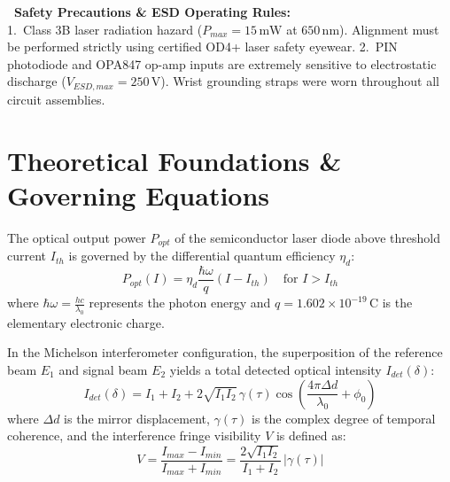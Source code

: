 \documentclass[11pt,a4paper,parskip=half,headsepline=0.6pt,footsepline=0.4pt]{scrartcl}
\begin{document}
\par \vspace{2pt}

\begin{tcolorbox}[calloutbox]
  \textcolor{coralhighlight}{\textbf{\faExclamationTriangle\ Safety Precautions \& ESD Operating Rules:}} \\
  \footnotesize
  1.~Class 3B laser radiation hazard ($P_{max} = 15\,\text{mW}$ at $650\,\text{nm}$). Alignment must be performed strictly using certified OD4+ laser safety eyewear. 2.~PIN photodiode and OPA847 op-amp inputs are extremely sensitive to electrostatic discharge ($V_{ESD, max} = 250\,\text{V}$). Wrist grounding straps were worn throughout all circuit assemblies.
\end{tcolorbox}

\vspace{1pt}

\section{Theoretical Foundations \& Governing Equations}

The optical output power $P_{opt}$ of the semiconductor laser diode above threshold current $I_{th}$ is governed by the differential quantum efficiency $\eta_d$:
\begin{equation}
  P_{opt}(I) = \eta_d \frac{\hbar \omega}{q} \left( I - I_{th} \right) \quad \text{for } I > I_{th}
\end{equation}
where $\hbar \omega = \frac{hc}{\lambda_0}$ represents the photon energy and $q = 1.602 \times 10^{-19}\,\text{C}$ is the elementary electronic charge.

In the Michelson interferometer configuration, the superposition of the reference beam $E_1$ and signal beam $E_2$ yields a total detected optical intensity $I_{det}(\delta)$:
\begin{equation}
  I_{det}(\delta) = I_1 + I_2 + 2\sqrt{I_1 I_2} \, \gamma(\tau) \cos\left( \frac{4\pi \Delta d}{\lambda_0} + \phi_0 \right)
\end{equation}
where $\Delta d$ is the mirror displacement, $\gamma(\tau)$ is the complex degree of temporal coherence, and the interference fringe visibility $V$ is defined as:
\begin{equation}
  V = \frac{I_{max} - I_{min}}{I_{max} + I_{min}} = \frac{2\sqrt{I_1 I_2}}{I_1 + I_2} \, \big|\gamma(\tau)\big|
\end{equation}
\end{document}
